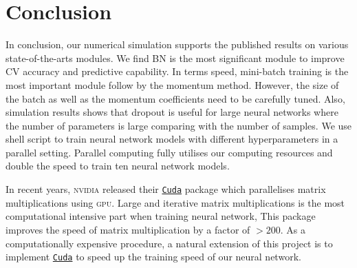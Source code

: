\section{Conclusion}
In conclusion, our numerical simulation supports the published results on various state-of-the-arts modules. We find BN is the most significant module to improve CV accuracy and predictive capability. In terms speed, mini-batch training is the most important module follow by the momentum method. However, the size of the batch as well as the momentum coefficients need to be carefully tuned. Also, simulation results shows that dropout is useful for large neural networks where the number of parameters is large comparing with the number of samples. We use shell script to train neural network models with different hyperparameters in a parallel setting. Parallel computing fully utilises our computing resources and double the speed to train ten neural network models.

In recent years, \textsc{nvidia} released their \href{https://developer.nvidia.com/cuda-zone}{\texttt{Cuda}} package which parallelises matrix multiplications using \textsc{gpu}. Large and iterative matrix multiplications is the most computational intensive part when training neural network, This package improves the speed of matrix multiplication by a factor of $>200$. As a computationally expensive procedure, a natural extension of this project is to implement \href{https://developer.nvidia.com/cuda-zone}{\texttt{Cuda}} to speed up the training speed of our neural network. 